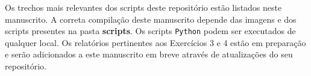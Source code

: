 
Os trechos mais relevantes dos scripts deste repositório estão listados neste manuscrito. A correta compilação deste manuscrito depende das imagens e dos scripts presentes na pasta \textbf{scripts}. Os scripts \texttt{Python} podem ser executados de qualquer local. Os relatórios pertinentes aos Exercícios 3 e 4 estão em preparação e serão adicionados a este manuscrito em breve através de atualizações do seu repositório. 



